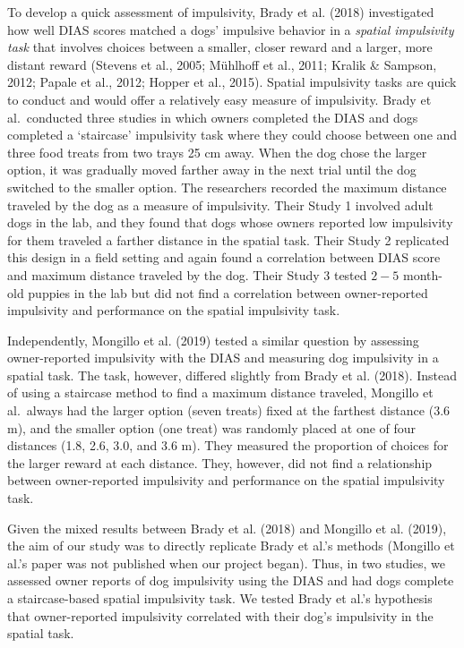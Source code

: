 \documentclass[
  pub,floatsintext]{apa6}
\begin{document}
To develop a quick assessment of impulsivity, Brady et al. (2018) investigated how well DIAS scores matched a dogs' impulsive behavior in a \emph{spatial impulsivity task} that involves choices between a smaller, closer reward and a larger, more distant reward (Stevens et al., 2005; Mühlhoff et al., 2011; Kralik \& Sampson, 2012; Papale et al., 2012; Hopper et al., 2015). Spatial impulsivity tasks are quick to conduct and would offer a relatively easy measure of impulsivity. Brady et al.~conducted three studies in which owners completed the DIAS and dogs completed a `staircase' impulsivity task where they could choose between one and three food treats from two trays 25 cm away. When the dog chose the larger option, it was gradually moved farther away in the next trial until the dog switched to the smaller option. The researchers recorded the maximum distance traveled by the dog as a measure of impulsivity. Their Study 1 involved adult dogs in the lab, and they found that dogs whose owners reported low impulsivity for them traveled a farther distance in the spatial task. Their Study 2 replicated this design in a field setting and again found a correlation between DIAS score and maximum distance traveled by the dog. Their Study 3 tested \(2-5\) month-old puppies in the lab but did not find a correlation between owner-reported impulsivity and performance on the spatial impulsivity task.

Independently, Mongillo et al. (2019) tested a similar question by assessing owner-reported impulsivity with the DIAS and measuring dog impulsivity in a spatial task. The task, however, differed slightly from Brady et al. (2018). Instead of using a staircase method to find a maximum distance traveled, Mongillo et al.~always had the larger option (seven treats) fixed at the farthest distance (3.6 m), and the smaller option (one treat) was randomly placed at one of four distances (1.8, 2.6, 3.0, and 3.6 m). They measured the proportion of choices for the larger reward at each distance. They, however, did not find a relationship between owner-reported impulsivity and performance on the spatial impulsivity task.

Given the mixed results between Brady et al. (2018) and Mongillo et al. (2019), the aim of our study was to directly replicate Brady et al.'s methods (Mongillo et al.'s paper was not published when our project began). Thus, in two studies, we assessed owner reports of dog impulsivity using the DIAS and had dogs complete a staircase-based spatial impulsivity task. We tested Brady et al.'s hypothesis that owner-reported impulsivity correlated with their dog's impulsivity in the spatial task.
\end{document}
